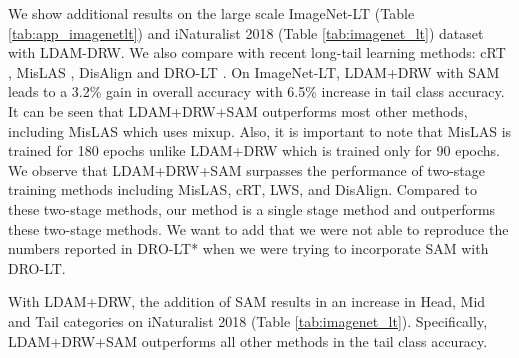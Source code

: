 \documentclass{article}
\begin{document}
We show additional results on the large scale ImageNet-LT (Table \ref{tab:app_imagenetlt}) and iNaturalist 2018 (Table \ref{tab:imagenet_lt}) dataset with LDAM-DRW. We also compare with recent long-tail learning methods:  cRT \cite{Kang2020Decoupling}, MisLAS \cite{zhong2021improving}, DisAlign \cite{zhang2021distribution} and DRO-LT \cite{Samuel_2021_ICCV}. On ImageNet-LT, LDAM+DRW with SAM leads to a 3.2\% gain in overall accuracy with 6.5\% increase in tail class accuracy. It can be seen that LDAM+DRW+SAM outperforms most other methods, including MisLAS which uses mixup. Also, it is important to note that MisLAS is trained for 180 epochs unlike LDAM+DRW which is trained only for 90 epochs. We observe that LDAM+DRW+SAM surpasses the performance of two-stage training methods including MisLAS, cRT, LWS, and DisAlign. Compared to these two-stage methods, our method is a single stage method and outperforms these two-stage methods. We want to add that we were not able to reproduce the numbers reported in DRO-LT* \cite{Samuel_2021_ICCV} when we were trying to incorporate SAM with DRO-LT.

With LDAM+DRW, the addition of SAM results in an increase in Head, Mid and Tail categories on iNaturalist 2018 (Table \ref{tab:imagenet_lt}). Specifically, LDAM+DRW+SAM outperforms all other methods in the tail class accuracy. 
\end{document}
